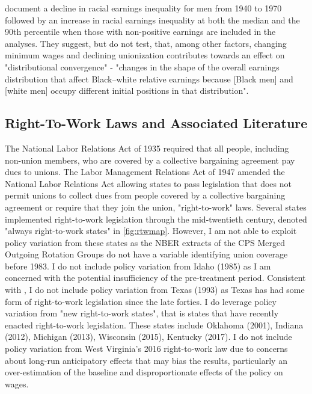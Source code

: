 \documentclass[11pt]{article}
\begin{document}
\citet{bayercharles2018} document a decline in racial earnings inequality for men from 1940 to 1970 followed by an increase in racial earnings inequality at both the median and the 90th percentile when those with non-positive earnings are included in the analyses. They suggest, but do not test, that, among other factors, changing minimum wages and declining unionization contributes towards an effect on "distributional convergence" - "changes in the shape of the overall earnings distribution that affect Black–white relative earnings because [Black men] and [white men] occupy different initial positions in that distribution".


\subsection{Right-To-Work Laws and Associated Literature}
The National Labor Relations Act of 1935 required that all people, including non-union members, who are covered by a collective bargaining agreement pay dues to unions. The Labor Management Relations Act of 1947 amended the National Labor Relations Act allowing states to pass legislation that does not permit unions to collect dues from people covered by a collective bargaining agreement or require that they join the union, "right-to-work" laws. Several states implemented right-to-work legislation through the mid-twentieth century, denoted "always right-to-work states" in \autoref{fig:rtwmap}. However, I am not able to exploit policy variation from these states as the NBER extracts of the CPS Merged Outgoing Rotation Groups do not have a variable identifying union coverage before 1983. I do not include policy variation from Idaho (1985) as I am concerned with the potential insufficiency of the pre-treatment period. Consistent with \citet{fll2018}, I do not include policy variation from Texas (1993) as Texas has had some form of right-to-work legislation since the late forties. I do leverage policy variation from "new right-to-work states", that is states that have recently enacted right-to-work legislation. These states include Oklahoma (2001), Indiana (2012), Michigan (2013), Wisconsin (2015), Kentucky (2017). I do not include policy variation from West Virginia's 2016 right-to-work law due to concerns about long-run anticipatory effects that may bias the results, particularly an over-estimation of the baseline and disproportionate effects of the policy on wages. 
\end{document}
